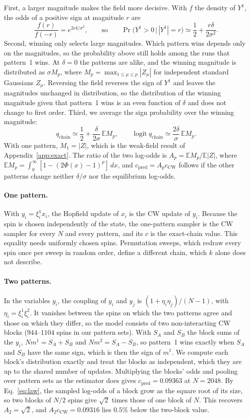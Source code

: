 \documentclass[final]{dynafront2026}
\newcommand{\qchain}{q_{\mathrm{chain}}}
\DeclareMathOperator{\logit}{logit}
\begin{document}
First, a larger magnitude makes the field more decisive. With $f$ the density
of $Y^1$, the odds of a positive sign at magnitude $r$ are
\[
 \frac{f(r)}{f(-r)}=e^{2r\delta/\sigma^2},
 \qquad\text{so}\qquad
 \Pr\big(Y^1>0\,\big|\,|Y^1|=r\big)\simeq\frac12+\frac{r\delta}{2\sigma^2}.
\]
Second, winning only selects large magnitudes. Which pattern wins depends
only on the magnitudes, so the probability above still holds among
the runs that pattern~1 wins. At $\delta=0$ the patterns are alike, and the
winning magnitude is distributed as $\sigma M_p$, where
$M_p=\max_{1\le\mu\le p}|Z_\mu|$ for independent standard Gaussians $Z_\mu$.
Reversing the field reverses the sign of $Y^1$ and leaves the magnitudes
unchanged in distribution, so the distribution of the winning magnitude given
that pattern~1 wins is an even function of $\delta$ and does not change to
first order. Third, we average the sign probability over
the winning magnitude:
\[
 \qchain\simeq\frac12+\frac{\delta}{2\sigma}\,\mathbb E M_p,
 \qquad
 \logit\qchain\simeq\frac{2\delta}{\sigma}\,\mathbb E M_p .
\]
With one pattern, $M_1=|Z|$, which is the weak-field result of
Appendix~\ref{app:exact}. The ratio of the two log-odds is
$A_p=\mathbb E M_p/\mathbb E|Z|$, where
$\mathbb E M_p=\int_0^\infty[1-(2\Phi(x)-1)^p]\,dx$, and $c_{\mathrm{pred}}=A_pc_{\mathrm{CW}}$
follows if the other patterns change neither $\delta/\sigma$ nor the
equilibrium log-odds.

\paragraph{One pattern.}
With $y_i=\xi_i^1x_i$, the Hopfield update of $x_i$ is the CW update of
$y_i$. Because the spin is chosen independently of the state, the one-pattern
sampler is the CW sampler for every $N$ and every pattern, and its $c$ is the
exact-chain value. This equality needs uniformly chosen spins. Permutation
sweeps, which redraw every spin once per sweep in random order, define a
different chain, which $k$ alone does not describe.

\paragraph{Two patterns.}
In the variables $y_i$, the coupling of $y_i$ and $y_j$ is
$(1+\eta_i\eta_j)/(N-1)$, with $\eta_i=\xi_i^1\xi_i^2$. It vanishes between
the spins on which the two patterns agree and those on which they differ, so
the model consists of two non-interacting CW blocks ($944$--$1104$ spins in
our pattern sets). With $S_A$ and $S_B$ the block sums of the $y_i$,
$Nm^1=S_A+S_B$ and $Nm^2=S_A-S_B$, so pattern~1 wins exactly when $S_A$ and
$S_B$ have the same sign, which is then the sign of $m^1$. We compute each
block's distribution exactly and treat the blocks as independent, which they
are up to the shared number of updates. Multiplying the blocks' odds and
pooling over pattern sets as the estimator does gives
$c_{\mathrm{pred}}=0.09363$ at $N=2048$. By Eq.~\eqref{eq:law}, the sampled
log-odds of a block grow as the square root of its size, so two blocks of
$N/2$ spins give $\sqrt2$ times those of one block of $N$. This recovers
$A_2=\sqrt2$, and $A_2c_{\mathrm{CW}}=0.09316$ lies $0.5\%$ below the
two-block value.
\end{document}
